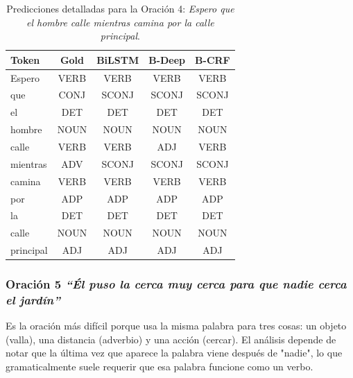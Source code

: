 \documentclass[12pt, a4paper]{article}
\begin{document}
\begin{table}[H]
    \centering
    \caption{Predicciones detalladas para la Oración 4: \textit{Espero que el hombre calle mientras camina por la calle principal}.}
    \label{tab:inf4_vert}
    \begin{tabular}{lcccc}
        \toprule
        \textbf{Token} & \textbf{Gold} & \textbf{BiLSTM} & \textbf{B-Deep} & \textbf{B-CRF} \\
        \midrule
        Espero    & VERB & VERB & VERB  & VERB \\
        que       & CONJ & SCONJ & SCONJ & SCONJ \\
        el        & DET  & DET & DET   & DET \\
        hombre    & NOUN & NOUN & NOUN  & NOUN \\
        calle     & VERB & VERB & ADJ   & VERB \\
        mientras  & ADV  & SCONJ & SCONJ & SCONJ \\
        camina    & VERB & VERB & VERB  & VERB \\
        por       & ADP  & ADP & ADP   & ADP \\
        la        & DET  & DET & DET   & DET \\
        calle     & NOUN & NOUN & NOUN  & NOUN \\
        principal & ADJ  & ADJ & ADJ   & ADJ \\
        \bottomrule
    \end{tabular}
\end{table}


\subsubsection{Oración 5 \textit{``Él puso la cerca muy cerca para que nadie cerca el jardín''}}

Es la oración más difícil porque usa la misma palabra para tres cosas: un objeto (valla), una distancia (adverbio) y una acción (cercar). El análisis depende de notar que la última vez que aparece la palabra viene después de "nadie", lo que gramaticalmente suele requerir que esa palabra funcione como un verbo.
\end{document}
